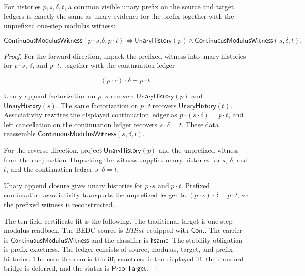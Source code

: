 \begin{theorem}
\label{thm:continuous-modulus-witness-prefix-iff}
For histories $p,s,\delta,t$, a common visible unary prefix on the source and
target ledgers is exactly the same as unary evidence for the prefix together
with the unprefixed one-step modulus witness:

$$
\mathsf{ContinuousModulusWitness}(p\cdot s,\delta,p\cdot t)
\Longleftrightarrow
\mathsf{UnaryHistory}(p)\wedge
\mathsf{ContinuousModulusWitness}(s,\delta,t).
$$
\end{theorem}
\begin{proof}
For the forward direction, unpack the prefixed witness into unary histories for
$p\cdot s$, $\delta$, and $p\cdot t$, together with the continuation ledger

$$
(p\cdot s)\cdot\delta=p\cdot t.
$$

Unary append factorization on $p\cdot s$ recovers
$\mathsf{UnaryHistory}(p)$ and $\mathsf{UnaryHistory}(s)$. The same
factorization on $p\cdot t$ recovers $\mathsf{UnaryHistory}(t)$. Associativity
rewrites the displayed continuation ledger as
$p\cdot(s\cdot\delta)=p\cdot t$, and left cancellation on the continuation
ledger recovers $s\cdot\delta=t$. These data reassemble
$\mathsf{ContinuousModulusWitness}(s,\delta,t)$.

For the reverse direction, project $\mathsf{UnaryHistory}(p)$ and the
unprefixed witness from the conjunction. Unpacking the witness supplies unary
histories for $s$, $\delta$, and $t$, and the continuation ledger
$s\cdot\delta=t$.

Unary append closure gives unary histories for $p\cdot s$ and $p\cdot t$.
Prefixed continuation associativity transports the unprefixed ledger to
$(p\cdot s)\cdot\delta=p\cdot t$, so the prefixed witness is reconstructed.

The ten-field certificate fit is the following. The traditional target is
one-step modulus readback. The BEDC source is $BHist$ equipped with
$\mathsf{Cont}$. The carrier is $\mathsf{ContinuousModulusWitness}$ and the
classifier is $\mathsf{hsame}$. The stability obligation is prefix exactness.
The ledger consists of source, modulus, target, and prefix histories. The core
theorem is this iff, exactness is the displayed iff, the standard bridge is
deferred, and the status is $\mathsf{ProofTarget}$.
\end{proof}

